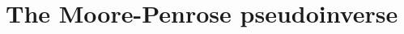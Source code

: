 \chapter{The Moore-Penrose pseudoinverse}






\clearpage
\thispagestyle{empty}
\begin{landscape}
\end{landscape}

\endinput